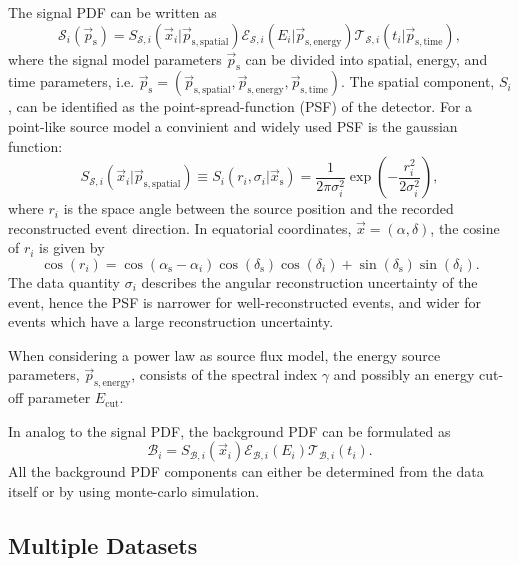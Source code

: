 \documentclass{article}
\newcommand{\ps}{\vec{p}_{\mathrm{s}}}
\newcommand{\xs}{\vec{x}_{\mathrm{s}}}
\begin{document}
The signal PDF can be written as
\begin{equation}
 \mathcal{S}_i(\ps) = S_{\mathcal{S},i}(\vec{x}_i|\vec{p}_{\mathrm{s,spatial}}) \mathcal{E}_{\mathcal{S},i}(E_i|\vec{p}_{\mathrm{s,energy}}) \mathcal{T}_{\mathcal{S},i}(t_i|\vec{p}_{\mathrm{s,time}}),
\end{equation}
where the signal model parameters $\ps$ can be divided into spatial, energy, and
time parameters, i.e. $\vec{p}_{\mathrm{s}} = (\vec{p}_{\mathrm{s,spatial}},
\vec{p}_{\mathrm{s,energy}}, \vec{p}_{\mathrm{s,time}})$. The spatial component,
$S_i$, can be identified as the point-spread-function (PSF) of the detector.
For a point-like source model a convinient and widely used PSF is the gaussian
function:
\begin{equation}
 S_{\mathcal{S},i}(\vec{x}_i|\vec{p}_{\mathrm{s,spatial}}) \equiv S_i(r_i,\sigma_i|\xs) = \frac{1}{2\pi\sigma_i^2}\exp\left({-\frac{r_i^2}{2\sigma_i^2}}\right),
\end{equation}
where $r_i$ is the space angle between the source position and the recorded
reconstructed event direction. In equatorial coordinates,
$\vec{x} = (\alpha,\delta)$, the cosine of $r_i$ is given by
\begin{equation}
 \cos(r_i) = \cos(\alpha_{\mathrm{s}} - \alpha_i) \cos(\delta_{\mathrm{s}})\cos({\delta_i}) + \sin(\delta_{\mathrm{s}})\sin(\delta_i).
\end{equation}
The data quantity $\sigma_i$ describes the angular reconstruction uncertainty of
the event, hence the PSF is narrower for well-reconstructed events, and wider
for events which have a large reconstruction uncertainty.

When considering a power law as source flux model, the energy source parameters,
$\vec{p}_{\mathrm{s,energy}}$, consists of the spectral index $\gamma$ and possibly
an energy cut-off parameter $E_{\mathrm{cut}}$.

In analog to the signal PDF, the background PDF can be formulated as
\begin{equation}
 \mathcal{B}_i = S_{\mathcal{B},i}(\vec{x}_i) \mathcal{E}_{\mathcal{B},i}(E_i) \mathcal{T}_{\mathcal{B},i}(t_i).
\end{equation}
All the background PDF components can either be determined from the data itself
or by using monte-carlo simulation.


\subsection{Multiple Datasets}
\end{document}
